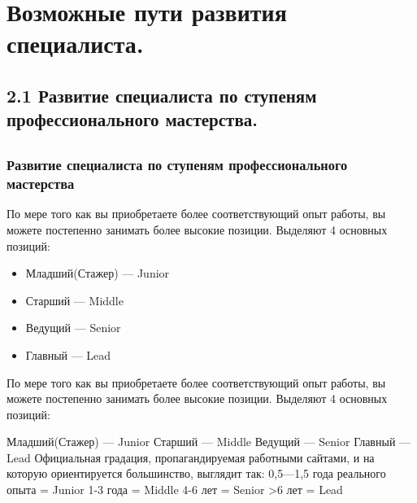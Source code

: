 \documentclass{../industrial-development}
\begin{document}
\section{Возможные пути развития специалиста. }

\subsection{2.1 Развитие  специалиста по ступеням профессионального мастерства. }


\subsection{}

\begin{frame} \frametitle{Развитие  специалиста по ступеням профессионального мастерства}
  \begin{block}{}
  По мере того как вы приобретаете более соответствующий опыт работы, вы можете постепенно занимать более высокие позиции. Выделяют 4 основных позиций:
  \end{block}
  
  \begin{itemize}
  \item Младший(Стажер) --- Junior
  \item Старший --- Middle
  \item Ведущий --- Senior
 \item Главный --- Lead
  \end{itemize}
\end{frame}

\lecturenotes
 По мере того как вы приобретаете более соответствующий опыт работы, вы можете постепенно занимать более высокие позиции. Выделяют 4 основных позиций:

 Младший(Стажер) --- Junior
Старший --- Middle
Ведущий --- Senior
 Главный --- Lead
Официальная градация, пропагандируемая работными сайтами, и на которую ориентируется большинство, выглядит так:
	0,5---1,5 года реального опыта = Junior
	1-3 года = Middle 
	4-6 лет = Senior
	>6 лет = Lead
\end{document}
